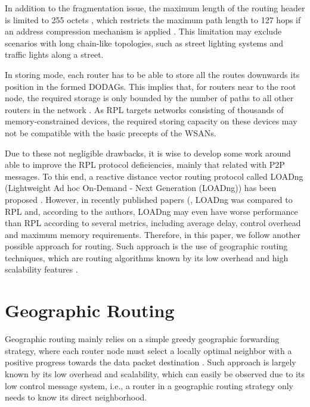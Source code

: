 \documentclass[final,authoryear,3p,twocolumn]{elsarticle}
\begin{document}
In addition to the fragmentation issue, the maximum length of the routing header is limited to 255 octets \citep{RFC4944}, which restricts the maximum path length to 127 hops if an address compression mechanism is applied \citep{herberg}. This limitation may exclude scenarios with long chain-like topologies, such as street lighting systems and traffic lights along a street.

In storing mode, each router has to be able to store all the routes downwards its position in the formed DODAGs. This implies that, for routers near to the root node, the required storage is only bounded by the number of paths to all other routers in the network \citep{RPL_observations}. As RPL targets networks consisting of thousands of memory-constrained devices, the required storing capacity on these devices may not be compatible with the basic precepts of the WSANs.

Due to these not negligible drawbacks, it is wise to develop some work around able to improve the RPL protocol deficiencies, mainly that related with P2P messages. To this end, a reactive distance vector routing protocol called LOADng (Lightweight Ad hoc On-Demand - Next Generation (LOADng)) has been proposed \citep{LOADng_2012}. However, in recently published papers (\citep{Tripathi2014, Vucinic_2013}, LOADng was compared to RPL  and, according to the authors, LOADng may even have worse performance than RPL according to several metrics, including average delay, control overhead and maximum memory requirements. Therefore, in this paper, we follow another possible approach for routing. Such approach is the use of geographic routing techniques, which are routing algorithms known by its low overhead and high scalability features \citep{Karp_GPSR_2000, survey_2007, GOAFR_2008}.


\section{Geographic Routing}
\label{secGeographicRouting}

Geographic routing mainly relies on a simple greedy geographic forwarding strategy, where each router node must select a locally optimal neighbor with a positive progress towards the data packet destination \citep{survey_2007}. Such approach is largely known by its low overhead and scalability, which can easily be observed due to its low control message system, i.e., a router in a geographic routing strategy only needs to know its direct neighborhood.
\end{document}
